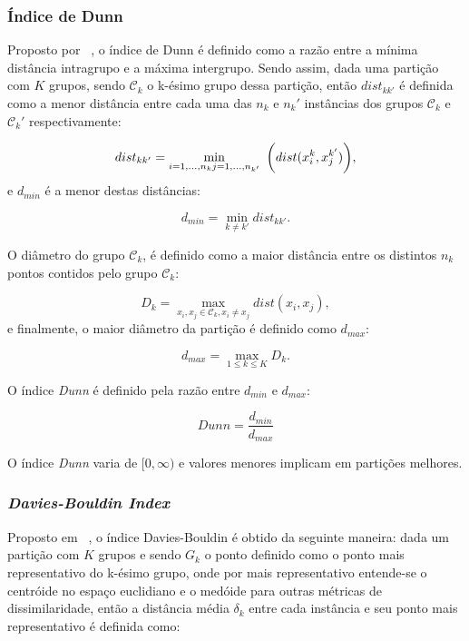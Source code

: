 \subsubsection{Índice de Dunn}

Proposto por ~\parencite{Dunn}, o índice de Dunn é definido como a razão entre a mínima distância intragrupo e a máxima intergrupo. Sendo assim, dada uma partição com $K$ grupos, sendo $\mathcal{C}_k$ o k-ésimo grupo dessa partição, então $dist_{kk'}$ é definida como a menor distância entre cada uma das  $n_k$ e $n_k'$ instâncias dos grupos $\mathcal{C}_k$ e $\mathcal{C}_k'$ respectivamente:

\begin{equation}
dist_{kk'} = \min_{i=1,...,n_k\\j=1,...,n_{k'}} \text{			} \bigg(dist(x_{i}^{k},x_{j}^{k'})\bigg),
\end{equation}
e $d_{min}$ é a menor destas distâncias:

\begin{equation}
d_{min} = \min_{k \neq k'} dist_{kk'}.
\end{equation}

O diâmetro do grupo $\mathcal{C}_k$, é definido como a maior distância entre os distintos $n_k$ pontos contidos pelo grupo $\mathcal{C}_k$:

\begin{equation}
D_k = \max_{x_i,x_j \in \mathcal{C}_k, x_i \neq x_j} dist(x_i,x_j),
\end{equation}
e finalmente, o maior diâmetro da partição é definido como $d_{max}$:

\begin{equation}
d_{max} = \max_{1\leq k \leq K} D_k.
\end{equation}

O índice \emph{Dunn} é definido pela razão entre $d_{min}$ e $d_{max}$:

\begin{equation}
Dunn = \frac{d_{min}}{d_{max}}
\end{equation}

O índice \emph{Dunn} varia de $[0,\infty)$ e valores menores implicam em partições melhores.

\subsubsection{\emph{Davies-Bouldin Index}}

Proposto em ~\parencite{DBI}, o índice Davies-Bouldin é obtido da seguinte maneira: dada um partição com $K$ grupos e sendo $G_k$ o ponto definido como o ponto mais representativo do k-ésimo grupo, onde por mais representativo entende-se o centróide no espaço euclidiano e o medóide para outras métricas de dissimilaridade, então a  distância média $\delta_k$ entre cada instância e seu ponto mais representativo é definida como:

